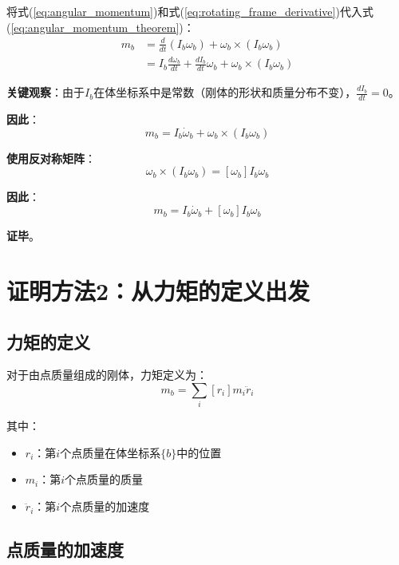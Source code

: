 \documentclass[12pt,a4paper]{article}
\begin{document}
将式(\ref{eq:angular_momentum})和式(\ref{eq:rotating_frame_derivative})代入式(\ref{eq:angular_momentum_theorem})：
\begin{align}
m_b &= \frac{d}{dt}(I_b \omega_b) + \omega_b \times (I_b \omega_b) \\
&= I_b \frac{d\omega_b}{dt} + \frac{dI_b}{dt} \omega_b + \omega_b \times (I_b \omega_b)
\end{align}

\textbf{关键观察}：由于$I_b$在体坐标系中是常数（刚体的形状和质量分布不变），$\frac{dI_b}{dt} = 0$。

\textbf{因此}：
\begin{equation}
m_b = I_b \dot{\omega}_b + \omega_b \times (I_b \omega_b)
\end{equation}

\textbf{使用反对称矩阵}：
\begin{equation}
\omega_b \times (I_b \omega_b) = [\omega_b] I_b \omega_b
\end{equation}

\textbf{因此}：
\begin{equation}
m_b = I_b \dot{\omega}_b + [\omega_b] I_b \omega_b
\end{equation}

\textbf{证毕}。

\section{证明方法2：从力矩的定义出发}

\subsection{力矩的定义}

对于由点质量组成的刚体，力矩定义为：
\begin{equation}
m_b = \sum_i [r_i] m_i \ddot{r}_i
\label{eq:torque_definition}
\end{equation}

其中：
\begin{itemize}
\item $r_i$：第$i$个点质量在体坐标系$\{b\}$中的位置
\item $m_i$：第$i$个点质量的质量
\item $\ddot{r}_i$：第$i$个点质量的加速度
\end{itemize}

\subsection{点质量的加速度}
\end{document}
